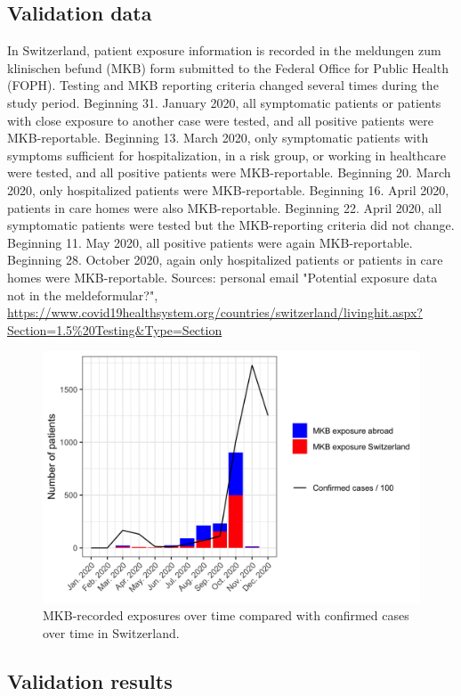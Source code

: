 \documentclass[9pt,twoside,lineno]{pnas-new}
\begin{document}
\subsection{Validation data}
In Switzerland, patient exposure information is recorded in the meldungen zum klinischen befund (MKB) form submitted to the Federal Office for Public Health (FOPH). Testing and MKB reporting criteria changed several times during the study period. %
Beginning 31. January 2020, all symptomatic patients or patients with close exposure to another case were tested, and all positive patients were MKB-reportable. Beginning 13. March 2020, only symptomatic patients with symptoms sufficient for hospitalization, in a risk group, or working in healthcare were tested, and all positive patients were MKB-reportable. Beginning 20. March 2020, only hospitalized patients were MKB-reportable. Beginning 16. April 2020, patients in care homes were also MKB-reportable. Beginning 22. April 2020, all symptomatic patients were tested but the MKB-reporting criteria did not change. Beginning 11. May 2020, all positive patients were again MKB-reportable. Beginning 28. October 2020, again only hospitalized patients or patients in care homes were MKB-reportable. Sources: personal email "Potential exposure data not in the meldeformular?", \url{https://www.covid19healthsystem.org/countries/switzerland/livinghit.aspx?Section=1.5%20Testing&Type=Section}

\begin{figure}[tbhp]
\centering
\includegraphics[width = 0.8\linewidth]{figures/fig_SX_mkb_exposures.png}
\caption{MKB-recorded exposures over time compared with confirmed cases over time in Switzerland.}  
\label{fig:mkb-exposures}
\end{figure}

\subsection{Validation results}
\end{document}
